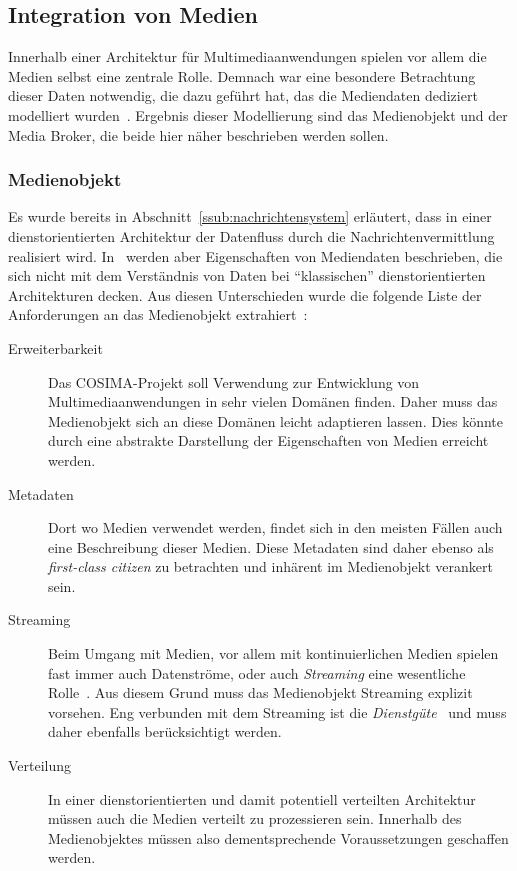 \subsection{Integration von Medien} %
\label{sub:integration_von_medien}

  Innerhalb einer Architektur für Multimediaanwendungen spielen vor allem die Medien selbst eine zentrale Rolle. Demnach war eine besondere Betrachtung dieser Daten notwendig, die dazu geführt hat, das die Mediendaten dediziert modelliert wurden~\citep{bericht}. Ergebnis dieser Modellierung sind das Medienobjekt und der Media Broker, die beide hier näher beschrieben werden sollen.
  
\subsubsection{Medienobjekt} %
\label{ssub:medienobjekt}

  Es wurde bereits in Abschnitt~\ref{ssub:nachrichtensystem} erläutert, dass in einer dienstorientierten Architektur der Datenfluss durch die Nachrichtenvermittlung realisiert wird. In~\citep[S. 27ff]{bericht} werden aber Eigenschaften von Mediendaten beschrieben, die sich nicht mit dem Verständnis von Daten bei "`klassischen"' dienstorientierten Architekturen decken. Aus diesen Unterschieden wurde die folgende Liste der Anforderungen an das Medienobjekt extrahiert~\citep{bericht}:
  
  \begin{description}
    \item[Erweiterbarkeit] Das COSIMA-Projekt soll Verwendung zur Entwicklung von Multimediaanwendungen in sehr vielen Domänen finden. Daher muss das Medienobjekt sich an diese Domänen leicht adaptieren lassen. Dies könnte durch eine abstrakte Darstellung der Eigenschaften von Medien erreicht werden.
    \item[Metadaten] Dort wo Medien verwendet werden, findet sich in den meisten Fällen auch eine Beschreibung dieser Medien. Diese Metadaten sind daher ebenso als \emph{first-class citizen} zu betrachten und inhärent im Medienobjekt verankert sein.
    \item[Streaming] Beim Umgang mit Medien, vor allem mit kontinuierlichen Medien spielen fast immer auch Datenströme, oder auch \emph{Streaming} eine wesentliche Rolle~\citep[S. 14ff]{multimedia_technologie}. Aus diesem Grund muss das Medienobjekt Streaming explizit vorsehen. Eng verbunden mit dem Streaming ist die \emph{Dienstgüte}~\citep{multimedia_technologie} und muss daher ebenfalls berücksichtigt werden.
    \item[Verteilung] In einer dienstorientierten und damit potentiell verteilten Architektur müssen auch die Medien verteilt zu prozessieren sein. Innerhalb des Medienobjektes müssen also dementsprechende Voraussetzungen geschaffen werden.
  \end{description}

